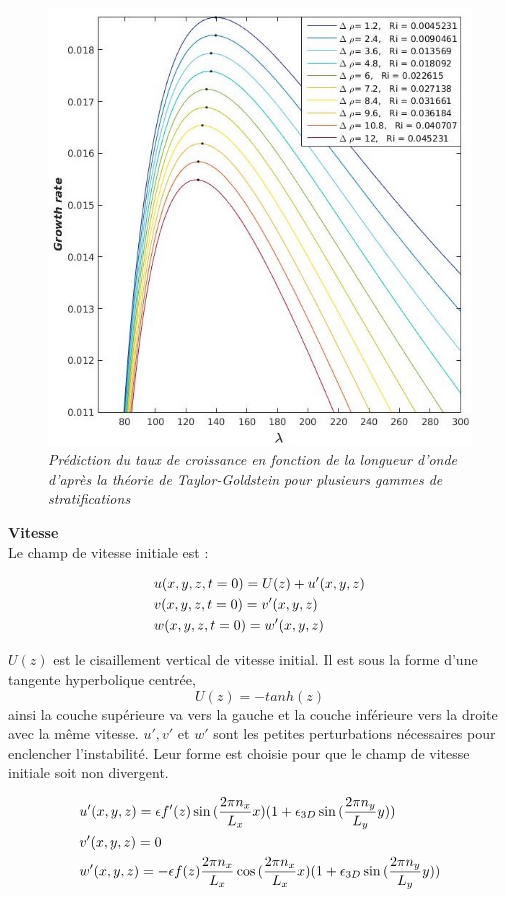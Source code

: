 \documentclass[a4paper,12pt]{article}
\begin{document}
    \begin{figure}[!h]
	\centering		
		\includegraphics[width=0.55\linewidth]{figures/TG_delatrho.jpg}
\caption[Taylor-Goldstein]{\textit{Prédiction du taux de croissance en fonction de la longueur d'onde d'après la théorie de Taylor-Goldstein pour plusieurs gammes de stratifications}}
	\label{TG_deltarho}
\end{figure}
    \newline
    \textbf{Vitesse} \\
    Le champ de vitesse initiale est : 
    \begin{subequation}
    \begin{align}
        \displaystyle
            \label{u_ini}
            & u(x,y,z,t=0)=U(z)+u'(x,y,z) \\
            \label{v_ini}
            & v(x,y,z,t=0)=v'(x,y,z) \\
            \label{w_ini}
            & w(x,y,z,t=0)=w'(x,y,z)
    \end{align}
    \end{subequation}
    $U(z)$ est le cisaillement vertical de vitesse initial. Il est sous la forme d'une tangente hyperbolique centrée,
    \begin{equation}
        \label{u0_ini}
        U(z)=-tanh(z)
    \end{equation}
    ainsi la couche supérieure va vers la gauche et la couche inférieure vers la droite avec la même vitesse. $u', v'$ et $w'$ sont les petites perturbations nécessaires pour enclencher l'instabilité. Leur forme est choisie pour que le champ de vitesse initiale soit non divergent.
    \begin{subequation}
        \begin{align}
        \displaystyle
            \label{u'_ini}
            & u'(x,y,z)=\epsilon f'(z)\sin{(\frac{2\pi n_x}{L_x}x)}(1+\epsilon_{3D}\sin{(\frac{2\pi n_y}{L_y}y)}) \\
            \label{v'_ini}
            & v'(x,y,z)=0 \\
            \label{w'_ini}
            & w'(x,y,z)=-\epsilon f(z)\frac{2\pi n_x}{L_x}\cos{(\frac{2\pi n_x}{L_x}x)}(1+\epsilon_{3D}\sin{(\frac{2\pi n_y}{L_y}y)})
        \end{align}
    \end{subequation}
\end{document}
